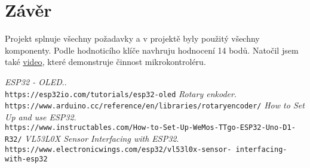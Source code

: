 \graphicspath{{Images/}}
\hypersetup{linkcolor=blue, urlcolor=blue}

\section{Závěr}

\begin{spacing}{1.5}
    \fontsize{14}{14}\selectfont
    Projekt splnuje všechny požadavky a v projektě byly použitý všechny komponenty. Podle hodnoticího klíče navhruju hodnocení 14 bodů. Natočil jsem také  \href{https://youtu.be/Wkc96NRYjaM?si=gknM33OhA-TyJOzl}{video}, které demonstruje činnost mikrokontroléru.

\end{spacing}

\vspace{80pt}

\begin{spacing}{1.5}
    \fontsize{12}{12}\selectfont
\begin{thebibliography}{Info}
    \emph{ESP32 - OLED}..\\
    \verb|https://esp32io.com/tutorials/esp32-oled|
    \emph{Rotary enkoder}.\\
\verb|https://www.arduino.cc/reference/en/libraries/rotaryencoder/|
    \emph{How to Set Up and use ESP32}.\\
\verb|https://www.instructables.com/How-to-Set-Up-WeMos-TTgo-ESP32-Uno-D1-R32/|
    \emph{VL53L0X Sensor Interfacing with ESP32}.\\
\verb|https://www.electronicwings.com/esp32/vl53l0x-sensor- interfacing-with-esp32|
\end{thebibliography}



\end{spacing}